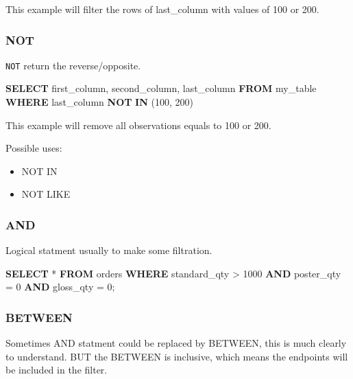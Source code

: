\documentclass[]{book}
\newenvironment{Shaded}{\begin{snugshade}}{\end{snugshade}}
\newcommand{\KeywordTok}[1]{\textcolor[rgb]{0.13,0.29,0.53}{\textbf{#1}}}
\newcommand{\DecValTok}[1]{\textcolor[rgb]{0.00,0.00,0.81}{#1}}
\newcommand{\NormalTok}[1]{#1}
\providecommand{\tightlist}{%
  \setlength{\itemsep}{0pt}\setlength{\parskip}{0pt}}
\begin{document}
This example will filter the rows of last\_column with values of 100 or
200.

\subsubsection{NOT}\label{not}

\texttt{NOT} return the reverse/opposite.

\begin{Shaded}
\begin{Highlighting}[]
\KeywordTok{SELECT}\NormalTok{ first_column, second_column, last_column}
  \KeywordTok{FROM}\NormalTok{ my_table}
\KeywordTok{WHERE}\NormalTok{ last_column }\KeywordTok{NOT} \KeywordTok{IN}\NormalTok{ (}\DecValTok{100}\NormalTok{, }\DecValTok{200}\NormalTok{)}
\end{Highlighting}
\end{Shaded}

This example will remove all observations equals to 100 or 200.

Possible uses:

\begin{itemize}
\tightlist
\item
  NOT IN
\item
  NOT LIKE
\end{itemize}

\subsubsection{AND}\label{and}

Logical statment usually to make some filtration.

\begin{Shaded}
\begin{Highlighting}[]
\KeywordTok{SELECT}\NormalTok{ *}
\KeywordTok{FROM}\NormalTok{ orders}
\KeywordTok{WHERE}\NormalTok{ standard_qty > }\DecValTok{1000} \KeywordTok{AND}\NormalTok{ poster_qty = }\DecValTok{0} \KeywordTok{AND}\NormalTok{ gloss_qty = }\DecValTok{0}\NormalTok{;}
\end{Highlighting}
\end{Shaded}

\subsubsection{BETWEEN}\label{between}

Sometimes AND statment could be replaced by BETWEEN, this is much
clearly to understand. BUT the BETWEEN is inclusive, which means the
endpoints will be included in the filter.
\end{document}
